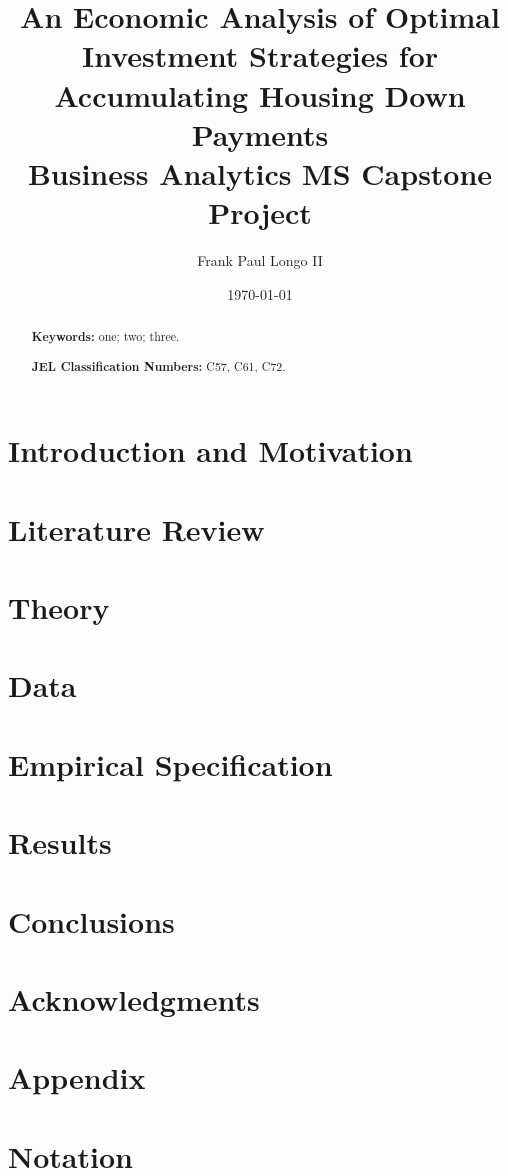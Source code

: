 \documentclass[10pt]{article}
\title{An Economic Analysis of Optimal Investment Strategies for Accumulating Housing Down Payments\\
       {\large Business Analytics MS Capstone Project}}
\author{Frank Paul Longo II}
\date{\today}
\begin{document}
\doublespace

\maketitle

\begin{abstract}


\bigskip
\bigskip

\noindent
\textbf{Keywords:} one; two; three.

\bigskip

\noindent
\textbf{JEL Classification Numbers:} C57, C61, C72.
\end{abstract}

\vfill
\eject

\section{Introduction and Motivation}


\section{Literature Review}


\section{Theory}


\section{Data}


\section{Empirical Specification}


\section{Results}


\section{Conclusions}


\section*{Acknowledgments}


\section*{Appendix}



\section*{Notation}




\end{document}
